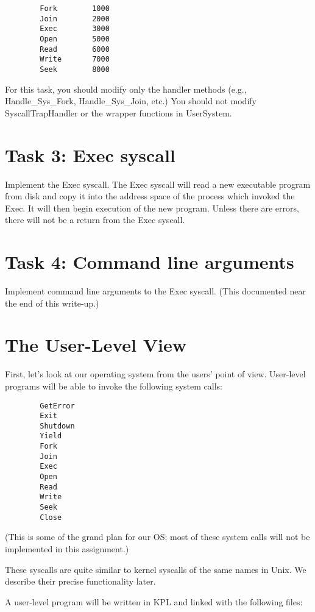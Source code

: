 \documentclass[12pt]{article}
\begin{document}
\begin{verbatim}
        Fork        1000
        Join        2000
        Exec        3000
        Open        5000
        Read        6000
        Write       7000
        Seek        8000
\end{verbatim}

For this task, you should modify only the handler methods (e.g.,
Handle\_Sys\_Fork, Handle\_Sys\_Join, etc.)  You should not modify
SyscallTrapHandler or the wrapper functions in UserSystem.

\section{Task 3: Exec syscall}

Implement the Exec syscall.  The Exec syscall will read a new
executable program from disk and copy it into the address space of the
process which invoked the Exec.  It will then begin execution of the
new program.  Unless there are errors, there will not be a return from
the Exec syscall.

\section{Task 4: Command line arguments}

Implement command line arguments to the Exec syscall.  (This documented near
the end of this write-up.)

\section{The User-Level View}

First, let's look at our operating system from the users' point of
view.  User-level programs will be able to invoke the following system
calls:

\begin{verbatim}
        GetError
        Exit
        Shutdown
        Yield
        Fork
        Join
        Exec
        Open
        Read
        Write
        Seek
        Close
\end{verbatim}

(This is some of the grand plan for our OS; most of these system calls will
not be implemented in this assignment.)

These syscalls are quite similar to kernel syscalls of the same names
in Unix.  We describe their precise functionality later.

A user-level program will be written in KPL and linked with the
following files:
\end{document}
